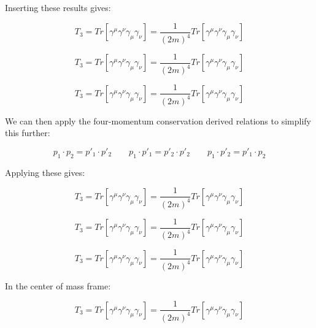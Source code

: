 \documentclass[a4]{article}
\begin{document}

    Inserting these results gives: 

    \begin{equation}
        T_3 = Tr [\gamma^\mu \gamma^\nu \gamma_\mu \gamma_\nu] = \frac{1}{(2 m)^4} Tr [\gamma^\mu \gamma^\nu \gamma_\mu \gamma_\nu]
    \end{equation}

    \begin{equation}
        T_3 = Tr [\gamma^\mu \gamma^\nu \gamma_\mu \gamma_\nu] = \frac{1}{(2 m)^4} Tr [\gamma^\mu \gamma^\nu \gamma_\mu \gamma_\nu]
    \end{equation}

    \begin{equation}
        T_3 = Tr [\gamma^\mu \gamma^\nu \gamma_\mu \gamma_\nu] = \frac{1}{(2 m)^4} Tr [\gamma^\mu \gamma^\nu \gamma_\mu \gamma_\nu]
    \end{equation}

    We can then apply the four-momentum conservation derived relations to simplify this further:

    \begin{equation}
        p_1 \cdot p_2 = p'_1 \cdot p'_2 \qquad p_1 \cdot p'_1 = p'_2 \cdot p'_2 \qquad p_1 \cdot p'_2 = p'_1 \cdot p_2
    \end{equation}

    Applying these gives:

    \begin{equation}
        T_3 = Tr [\gamma^\mu \gamma^\nu \gamma_\mu \gamma_\nu] = \frac{1}{(2 m)^4} Tr [\gamma^\mu \gamma^\nu \gamma_\mu \gamma_\nu]
    \end{equation}

    \begin{equation}
        T_3 = Tr [\gamma^\mu \gamma^\nu \gamma_\mu \gamma_\nu] = \frac{1}{(2 m)^4} Tr [\gamma^\mu \gamma^\nu \gamma_\mu \gamma_\nu]
    \end{equation}

    \begin{equation}
        T_3 = Tr [\gamma^\mu \gamma^\nu \gamma_\mu \gamma_\nu] = \frac{1}{(2 m)^4} Tr [\gamma^\mu \gamma^\nu \gamma_\mu \gamma_\nu]
    \end{equation}

    In the center of mass frame:

    \begin{equation}
        T_3 = Tr [\gamma^\mu \gamma^\nu \gamma_\mu \gamma_\nu] = \frac{1}{(2 m)^4} Tr [\gamma^\mu \gamma^\nu \gamma_\mu \gamma_\nu]
    \end{equation}
\end{document}
